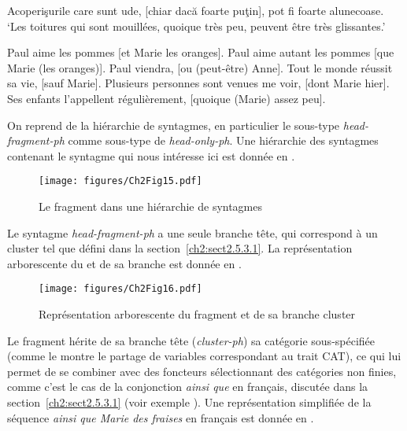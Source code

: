 \ex Acoperişurile care sunt ude, [chiar dacă foarte puţin], pot fi foarte alunecoase. \label{ch2:ex269f} 
\glt ‘Les toitures qui sont mouillées, quoique très peu, peuvent être très glissantes.’  
\z
\z


\ea \label{ch2:ex270}
\ea Paul aime les pommes [et Marie les oranges]. \label{ch2:ex270a}
\ex Paul aime autant les pommes [que Marie (les oranges)]. \label{ch2:ex270b}
\ex Paul viendra, [ou (peut-être) Anne]. \label{ch2:ex270c}
\ex Tout le monde réussit sa vie, [sauf Marie]. \label{ch2:ex270d}
\ex Plusieurs personnes sont venues me voir, [dont Marie hier]. \label{ch2:ex270e}
\ex Ses enfants l’appellent régulièrement, [quoique (Marie) assez peu]. \label{ch2:ex270f}  
\z
\z

On reprend de \citet{GinzburgEtAl2000} la hiérarchie de syntagmes, en particulier le sous-type \textit{head-fragment-ph} comme sous-type de \textit{head-only-ph}. Une hiérarchie des syntagmes contenant le syntagme qui nous intéresse ici est donnée en .

\begin{figure} 

\texttt{[image: figures/Ch2Fig15.pdf]}%

\caption{Le fragment dans une hiérarchie de syntagmes}
\label{ch2:fig15}
\end{figure}

Le syntagme \textit{head-fragment-ph} a une seule branche tête, qui correspond à un cluster tel que défini dans la section~\ref{ch2:sect2.5.3.1}. La représentation arborescente du  et de sa branche  est donnée en .

\begin{figure} 

\texttt{[image: figures/Ch2Fig16.pdf]}%

\caption{Représentation arborescente du fragment et de sa branche cluster}
\label{ch2:fig16}
\end{figure}

Le fragment hérite de sa branche tête (\textit{cluster-ph}) sa catégorie sous-spécifiée (comme le montre le partage de variables correspondant au trait CAT), ce qui lui permet de se combiner avec des foncteurs sélectionnant des catégories non finies, comme c’est le cas de la conjonction \textit{ainsi que} en français, discutée dans la section~\ref{ch2:sect2.5.3.1} (voir exemple ). Une représentation simplifiée de la séquence \textit{ainsi que Marie des fraises} en français est donnée en . 

